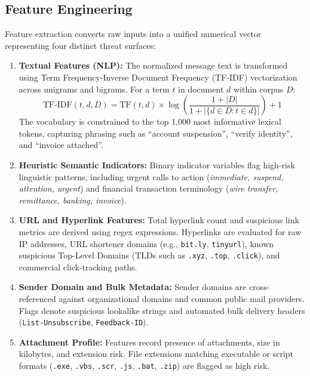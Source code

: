 \documentclass[conference]{IEEEtran}
\begin{document}
\subsection{Feature Engineering}
Feature extraction converts raw inputs into a unified numerical vector representing four distinct threat surfaces:
\begin{enumerate}
    \item \textbf{Textual Features (NLP):} The normalized message text is transformed using Term Frequency-Inverse Document Frequency (TF-IDF) vectorization across unigrams and bigrams. For a term $t$ in document $d$ within corpus $D$:
    \begin{equation}
        \text{TF-IDF}(t, d, D) = \text{TF}(t, d) \times \log\left(\frac{1 + |D|}{1 + |\{d \in D : t \in d\}|}\right) + 1
    \end{equation}
    The vocabulary is constrained to the top 1,000 most informative lexical tokens, capturing phrasing such as ``account suspension'', ``verify identity'', and ``invoice attached''.
    
    \item \textbf{Heuristic Semantic Indicators:} Binary indicator variables flag high-risk linguistic patterns, including urgent calls to action (\textit{immediate, suspend, attention, urgent}) and financial transaction terminology (\textit{wire transfer, remittance, banking, invoice}).
    
    \item \textbf{URL and Hyperlink Features:} Total hyperlink count and suspicious link metrics are derived using regex expressions. Hyperlinks are evaluated for raw IP addresses, URL shortener domains (e.g., \texttt{bit.ly}, \texttt{tinyurl}), known suspicious Top-Level Domains (TLDs such as \texttt{.xyz}, \texttt{.top}, \texttt{.click}), and commercial click-tracking paths.
    
    \item \textbf{Sender Domain and Bulk Metadata:} Sender domains are cross-referenced against organizational domains and common public mail providers. Flags denote suspicious lookalike strings and automated bulk delivery headers (\texttt{List-Unsubscribe}, \texttt{Feedback-ID}).
    
    \item \textbf{Attachment Profile:} Features record presence of attachments, size in kilobytes, and extension risk. File extensions matching executable or script formats (\texttt{.exe}, \texttt{.vbs}, \texttt{.scr}, \texttt{.js}, \texttt{.bat}, \texttt{.zip}) are flagged as high risk.
\end{enumerate}
\end{document}
